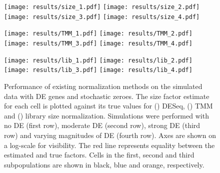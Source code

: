 \documentclass{article}
\begin{document}
\begin{figure}[tbp]
\begin{minipage}{0.33\textwidth}
\texttt{[image: results/size\_1.pdf]}
\texttt{[image: results/size\_2.pdf]}
\texttt{[image: results/size\_3.pdf]}
\texttt{[image: results/size\_4.pdf]}
\subcaption{}\label{subfig:size_sim}
\end{minipage}
\begin{minipage}{0.33\textwidth}
\texttt{[image: results/TMM\_1.pdf]}
\texttt{[image: results/TMM\_2.pdf]}
\texttt{[image: results/TMM\_3.pdf]}
\texttt{[image: results/TMM\_4.pdf]}
\subcaption{}\label{subfig:tmm_sim}
\end{minipage}
\begin{minipage}{0.33\textwidth}
\texttt{[image: results/lib\_1.pdf]}
\texttt{[image: results/lib\_2.pdf]}
\texttt{[image: results/lib\_3.pdf]}
\texttt{[image: results/lib\_4.pdf]}
\subcaption{}\label{subfig:lib_sim}
\end{minipage}
\caption{
    Performance of existing normalization methods on the simulated data with DE genes and stochastic zeroes.
    The size factor estimate for each cell is plotted against its true values for () DESeq,
        () TMM and () library size normalization.
    Simulations were performed with no DE (first row), moderate DE (second row), strong DE (third row) and varying magnitudes of DE (fourth row).
    Axes are shown on a log-scale for visibility.
    The red line represents equality between the estimated and true factors.
    Cells in the first, second and third subpopulations are shown in black, blue and orange, respectively.
}
\label{fig:existing_sim}
\end{figure}
\end{document}
